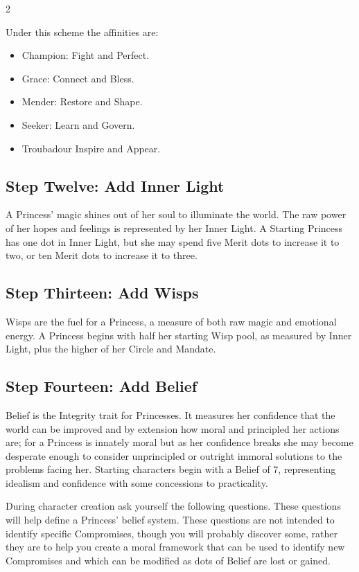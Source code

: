 \begin{multicols}{2}
\begin{mybox}
Under this scheme the affinities are: 

\begin{itemize}
\item Champion: Fight and Perfect.
\item Grace: Connect and Bless.
\item Mender: Restore and Shape.
\item Seeker: Learn and Govern.
\item Troubadour Inspire and Appear.
\end{itemize}

\end{mybox}


\subsection*{Step Twelve: Add Inner Light}

A Princess' magic shines out of her soul to illuminate the world. The raw power of her hopes and feelings is represented by her Inner Light. A Starting Princess has one dot in Inner Light, but she may spend five Merit dots to increase it to two, or ten Merit dots to increase it to three. 

\subsection*{Step Thirteen: Add Wisps}

Wisps are the fuel for a Princess, a measure of both raw magic and emotional energy. A Princess begins with half her starting Wisp pool, as measured by Inner Light, plus the higher of her Circle and Mandate.

\subsection*{Step Fourteen: Add Belief} 

Belief is the Integrity trait for Princesses. It measures her confidence that the world can be improved and by extension how moral and principled her actions are; for a Princess is innately moral but as her confidence breaks she may become desperate enough to consider unprincipled or outright immoral solutions to the problems facing her. Starting characters begin with a Belief of 7, representing idealism and confidence with some concessions to practicality. 

During character creation ask yourself the following questions. These questions will help define a Princess' belief system. These questions are not intended to identify specific Compromises, though you will probably discover some, rather they are to help you create a moral framework that can be used to identify new Compromises and which can be modified as dots of Belief are lost or gained.  


\end{multicols}
